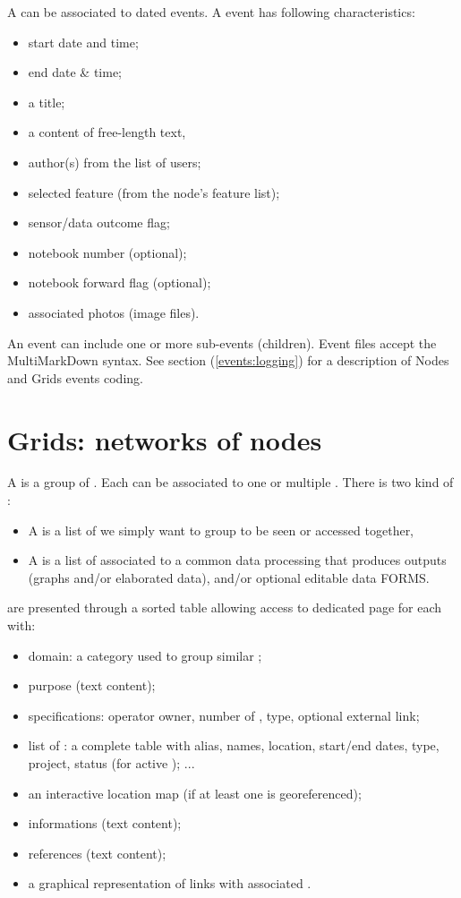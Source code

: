 A  can be associated to dated events. A  event has following characteristics:
\begin{itemize}
	\item start date and time;
	\item end date \& time;
	\item a title;
	\item a content of free-length text,
	\item author(s) from the list of \webobs users;
	\item selected feature (from the node's feature list);
	\item sensor/data outcome flag;
	\item notebook number (optional);
	\item notebook forward flag (optional);
	\item associated photos (image files).
\end{itemize}
An event can include one or more sub-events (children). Event files  accept the MultiMarkDown syntax. See  section (\ref{events:logging}) for a description of Nodes and Grids events coding.


\section{Grids: networks of nodes}
\label{grids}

A  is a group of . Each  can be associated to one or multiple . There is two kind of :

\begin{itemize}
\item    A  is a list of  we simply want to group to be seen or accessed together,
\item    A  is a list of  associated to a common data processing that produces outputs (graphs and/or elaborated data), and/or optional editable data FORMS.
\end{itemize}

 are presented through a sorted table allowing access to dedicated page for each  with:
\begin{itemize}
\item    domain: a category used to group similar ;
\item    purpose (text content);
\item    specifications: operator owner, number of , type, optional external link;
\item    list of : a complete table with alias, names, location, start/end dates, type, project, status (for active ); ...
\item    an interactive location map (if at least one  is georeferenced);
\item    informations (text content);
\item    references (text content);
\item    a graphical representation of  links with associated .
\end{itemize}

